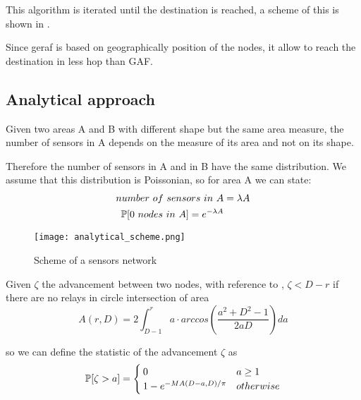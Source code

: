 This algorithm is iterated until the destination is reached, a scheme of this is shown in .

Since \gls{geraf} is based on geographically position of the nodes, it allow to reach the destination in less hop than GAF.

\subsection{Analytical approach}
	Given two areas A and B with different shape but the same area measure, the number of sensors in A depends on the measure of its area and not on its shape.

	Therefore the number of sensors in A and in B have the same distribution. We assume that this distribution is Poissonian, so for area A we can state:
	\begin{equation}
		\begin{split}
			number ~of ~sensors ~in ~A &= \lambda A \\
			\mathbb{P}[0 ~nodes ~in ~A] = e^{-\lambda A}
		\end{split}
	\end{equation}

	\begin{figure}[h]
		\centering
		\texttt{[image: analytical\_scheme.png]}
		\caption{Scheme of a sensors network}
		\label{fig:anapproach}
	\end{figure}


	Given $\zeta$ the advancement between two nodes, with reference to , $\zeta < D - r$ if there are no relays in circle intersection of area
	\begin{equation}
			A(r,D) = 2 \int_{D-1}^r a \cdot arccos\left( \frac{a^2 + D^2 - 1}{2aD}\right) da
	\end{equation}

	so we can define the statistic of the advancement $\zeta$ as
	\begin{equation}
		\mathbb{P}[\zeta > a] = \begin{cases}
			0 & a \ge 1\\
			1-e^{-MA(D-a,D)/\pi} & otherwise
		\end{cases}
	\end{equation}

